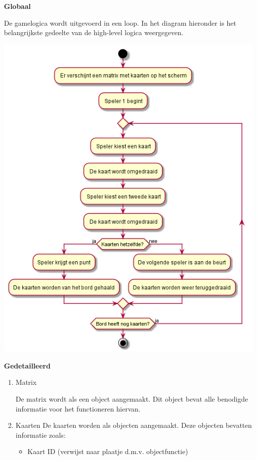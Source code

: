\documentclass[a4paper,titlepage,11pt]{article}
\begin{document}
{\bf Globaal}

De gamelogica wordt uitgevoerd in een loop. 
In het diagram hieronder is het belangrijkste gedeelte
van de high-level logica weergegeven. 

\begin{center}
\includegraphics[width=\linewidth]{../Images/diagram.png}
\end{center}

{\bf Gedetailleerd}

\begin{enumerate}
\item Matrix

De matrix wordt als een object aangemaakt. 
Dit object bevat alle benodigde informatie
voor het functioneren hiervan.
\item Kaarten
De kaarten worden als objecten aangemaakt. Deze objecten bevatten informatie zoals:

\begin{itemize}
\item Kaart ID (verwijst naar plaatje d.m.v. objectfunctie)
\end{itemize}
\end{enumerate}
\end{document}
